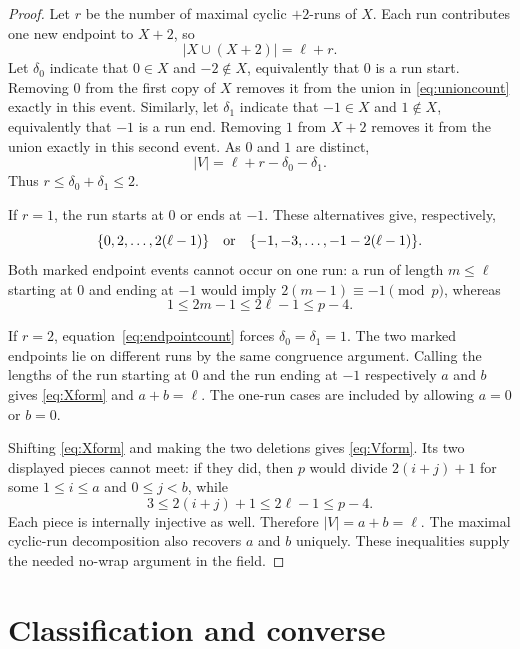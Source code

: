 \documentclass[11pt]{article}
\begin{document}
\begin{proof}
Let $r$ be the number of maximal cyclic $+2$-runs of $X$.  Each run
contributes one new endpoint to $X+2$, so
\begin{equation}\label{eq:unioncount}
 |X\cup(X+2)|=\ell+r.
\end{equation}
Let $\delta_0$ indicate that $0\in X$ and $-2\notin X$, equivalently that
$0$ is a run start.  Removing $0$ from the first copy of $X$ removes it
from the union in \eqref{eq:unioncount} exactly in this event.  Similarly,
let $\delta_1$ indicate that $-1\in X$ and $1\notin X$, equivalently that
$-1$ is a run end.  Removing $1$ from $X+2$ removes it from the union
exactly in this second event.  As $0$ and $1$ are distinct,
\begin{equation}\label{eq:endpointcount}
 |V|=\ell+r-\delta_0-\delta_1.
\end{equation}
Thus $r\leq\delta_0+\delta_1\leq2$.

If $r=1$, the run starts at $0$ or ends at $-1$.  These alternatives give,
respectively,
\[
 \{0,2,\ldots,2(\ell-1)\}
 \quad\hbox{or}\quad
 \{-1,-3,\ldots,-1-2(\ell-1)\}.
\]
Both marked endpoint events cannot occur on one run: a run of length
$m\leq\ell$ starting at $0$ and ending at $-1$ would imply
$2(m-1)\equiv-1\pmod p$, whereas
\[
 1\leq2m-1\leq2\ell-1\leq p-4.
\]

If $r=2$, equation~\eqref{eq:endpointcount} forces
$\delta_0=\delta_1=1$.  The two marked endpoints lie on different runs by
the same congruence argument.  Calling the lengths of the run starting at
$0$ and the run ending at $-1$ respectively $a$ and $b$ gives
\eqref{eq:Xform} and $a+b=\ell$.  The one-run cases are included by
allowing $a=0$ or $b=0$.

Shifting \eqref{eq:Xform} and making the two deletions gives
\eqref{eq:Vform}.  Its two displayed pieces cannot meet: if they did, then
$p$ would divide $2(i+j)+1$ for some $1\leq i\leq a$ and $0\leq j<b$,
while
\[
 3\leq2(i+j)+1\leq2\ell-1\leq p-4.
\]
Each piece is internally injective as well.  Therefore $|V|=a+b=\ell$.
The maximal cyclic-run decomposition also recovers $a$ and $b$ uniquely.
These inequalities supply the needed no-wrap argument in the field.
\end{proof}

\section{Classification and converse}
\end{document}

